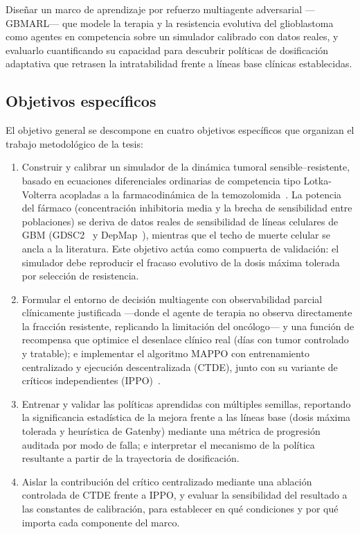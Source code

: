 Diseñar un marco de aprendizaje por refuerzo multiagente adversarial ---GBMARL--- que modele la terapia y la resistencia evolutiva del glioblastoma como agentes en competencia sobre un simulador calibrado con datos reales, y evaluarlo cuantificando su capacidad para descubrir políticas de dosificación adaptativa que retrasen la intratabilidad frente a líneas base clínicas establecidas.

\subsection{Objetivos específicos}
\label{subsec:objetivos-especificos}

El objetivo general se descompone en cuatro objetivos específicos que organizan el trabajo metodológico de la tesis:

\begin{enumerate}
  \item Construir y calibrar un simulador de la dinámica tumoral sensible--resistente, basado en ecuaciones diferenciales ordinarias de competencia tipo Lotka-Volterra acopladas a la farmacodinámica de la temozolomida~\cite{Strobl2020,Yin2019}. La potencia del fármaco (concentración inhibitoria media y la brecha de sensibilidad entre poblaciones) se deriva de datos reales de sensibilidad de líneas celulares de GBM (GDSC2~\cite{GDSC} y DepMap~\cite{DepMap}), mientras que el techo de muerte celular se ancla a la literatura. Este objetivo actúa como compuerta de validación: el simulador debe reproducir el fracaso evolutivo de la dosis máxima tolerada por selección de resistencia.

  \item Formular el entorno de decisión multiagente con observabilidad parcial clínicamente justificada ---donde el agente de terapia no observa directamente la fracción resistente, replicando la limitación del oncólogo--- y una función de recompensa que optimice el desenlace clínico real (días con tumor controlado y tratable); e implementar el algoritmo MAPPO con entrenamiento centralizado y ejecución descentralizada (CTDE), junto con su variante de críticos independientes (IPPO)~\cite{Amato2024,deWitt2020}.

  \item Entrenar y validar las políticas aprendidas con múltiples semillas, reportando la significancia estadística de la mejora frente a las líneas base (dosis máxima tolerada y heurística de Gatenby) mediante una métrica de progresión auditada por modo de falla; e interpretar el mecanismo de la política resultante a partir de la trayectoria de dosificación.

  \item Aislar la contribución del crítico centralizado mediante una ablación controlada de CTDE frente a IPPO, y evaluar la sensibilidad del resultado a las constantes de calibración, para establecer en qué condiciones y por qué importa cada componente del marco.
\end{enumerate}

